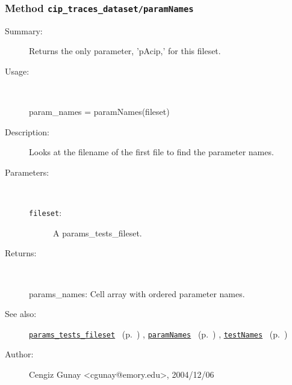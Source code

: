 \subsubsection[Method \texttt{paramNames}]{Method \texttt{cip\_traces\_dataset/paramNames}}%
%
\label{ref_cip_traces_dataset__paramNames}%
\hypertarget{ref_cip_traces_dataset__paramNames}{}%
\begin{description}
\item[Summary:]Returns the only parameter, 'pAcip,' for this fileset.
%
\item[Usage:]~%
\begin{lyxcode}%
param\_names = paramNames(fileset)
%
\end{lyxcode}%
%
\item[Description:]%
Looks at the filename of the first file to find the parameter names.
\item[Parameters:]~
\begin{description}%
\item[\texttt{fileset}:]
 A params\_tests\_fileset.
\end{description}%
%
\item[Returns:]~

	params\_names: Cell array with ordered parameter names.
%
%
\item[See also:]%
\hyperlink{ref_params_tests_fileset}{\texttt{params\_tests\_fileset}}%
\ (p.~\pageref{ref_params_tests_fileset})%
%
, \hyperlink{ref_paramNames}{\texttt{paramNames}}%
\ (p.~\pageref{ref_paramNames})%
%
, \hyperlink{ref_testNames}{\texttt{testNames}}%
\ (p.~\pageref{ref_testNames})%
%
%
\item[Author:]%
Cengiz Gunay <cgunay@emory.edu>, 2004/12/06%
\end{description}
\methodline%
